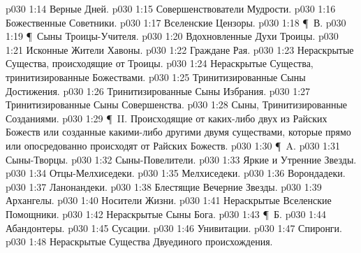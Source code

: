 \vs p030 1:14 \bibnobreakspace Верные Дней.
\vs p030 1:15 \bibnobreakspace Совершенствователи Мудрости.
\vs p030 1:16 \bibnobreakspace Божественные Советники.
\vs p030 1:17 \bibnobreakspace Вселенские Цензоры.
\vs p030 1:18 \P\ В. 
\vs p030 1:19 \P\ \bibnobreakspace Сыны Троицы\hyp{}Учителя.
\vs p030 1:20 \bibnobreakspace Вдохновленные Духи Троицы.
\vs p030 1:21 \bibnobreakspace Исконные Жители Хавоны.
\vs p030 1:22 \bibnobreakspace Граждане Рая.
\vs p030 1:23 \bibnobreakspace Нераскрытые Существа, происходящие от Троицы.
\vs p030 1:24 \bibnobreakspace Нераскрытые Существа, тринитизированные Божествами.
\vs p030 1:25 \bibnobreakspace Тринитизированные Сыны Достижения.
\vs p030 1:26 \bibnobreakspace Тринитизированные Сыны Избрания.
\vs p030 1:27 \bibnobreakspace Тринитизированные Сыны Совершенства.
\vs p030 1:28 \bibnobreakspace Сыны, Тринитизированные Созданиями.
\vs p030 1:29 \P\ II.  Происходящие от каких\hyp{}либо двух из Райских Божеств или созданные какими\hyp{}либо другими двумя существами, которые прямо или опосредованно происходят от Райских Божеств.
\vs p030 1:30 \P\ A. 
\vs p030 1:31 \bibnobreakspace Сыны\hyp{}Творцы.
\vs p030 1:32 \bibnobreakspace Сыны\hyp{}Повелители.
\vs p030 1:33 \bibnobreakspace Яркие и Утренние Звезды.
\vs p030 1:34 \bibnobreakspace Отцы\hyp{}Мелхиседеки.
\vs p030 1:35 \bibnobreakspace Мелхиседеки.
\vs p030 1:36 \bibnobreakspace Ворондадеки.
\vs p030 1:37 \bibnobreakspace Ланонандеки.
\vs p030 1:38 \bibnobreakspace Блестящие Вечерние Звезды.
\vs p030 1:39 \bibnobreakspace Архангелы.
\vs p030 1:40 \bibnobreakspace Носители Жизни.
\vs p030 1:41 \bibnobreakspace Нераскрытые Вселенские Помощники.
\vs p030 1:42 \bibnobreakspace Нераскрытые Сыны Бога.
\vs p030 1:43 \P\ Б. 
\vs p030 1:44 \bibnobreakspace Абандонтеры.
\vs p030 1:45 \bibnobreakspace Сусации.
\vs p030 1:46 \bibnobreakspace Унивитации.
\vs p030 1:47 \bibnobreakspace Спиронги.
\vs p030 1:48 \bibnobreakspace Нераскрытые Существа Двуединого происхождения.
